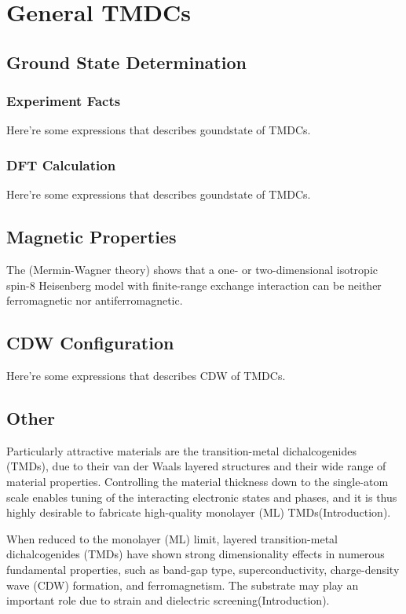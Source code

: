 \setchapterpreamble[u]{\margintoc}
\chapter{General TMDCs}

\section{Ground State Determination}
\subsection{Experiment Facts}
Here're some expressions that describes goundstate of TMDCs.

\subsection{DFT Calculation}
Here're some expressions that describes goundstate of TMDCs.

\section{Magnetic Properties}
The (Mermin-Wagner theory) shows that a one- or two-dimensional isotropic spin-8 Heisenberg model with finite-range exchange interaction can be neither ferromagnetic nor antiferromagnetic\cite{PhysRevLett.17.1133}.

\section{CDW Configuration}
Here're some expressions that describes CDW of TMDCs.

\section{Other}
Particularly attractive materials are the transition-metal dichalcogenides (TMDs), due to their van der Waals layered structures and their wide range of material properties. Controlling the material thickness down to the single-atom scale enables tuning of the interacting electronic states and phases, and it is thus highly desirable to fabricate high-quality monolayer (ML) TMDs\cite{doi:10.1021/acsnano.9b02996}(Introduction).

When reduced to the monolayer (ML) limit, layered transition-metal dichalcogenides (TMDs) have shown strong dimensionality effects in numerous fundamental properties, such as band-gap type, superconductivity, charge-density wave (CDW) formation, and ferromagnetism. The substrate may play an important role due to strain and dielectric screening\cite{doi:10.1021/acs.nanolett.8b01764}(Introduction).

